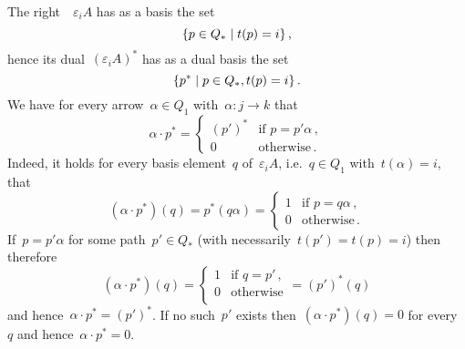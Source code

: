 \begin{remark*}
\begin{enumerate}
      The right~{}~$\varepsilon_i A$ has as a basis the set
      \begin{equation}
        \label{original basis}
        \{
          p \in Q_*
        \suchthat
          t(p) = i
        \}  \,,
      \end{equation}
      hence its dual~$(\varepsilon_i A)^*$ has as a dual basis the set
      \begin{equation}
        \label{dual basis}
        \{
          p^*
        \suchthat
          p \in Q_*,
          t(p) = i
        \}  \,.
      \end{equation}
      We have for every arrow~$\alpha \in Q_1$ with~$\alpha \colon j \to k$ that
      \begin{equation}
        \label{dual multiplication rule}
        \alpha \cdot p^*
        =
        \begin{cases}
          (p')^*  & \text{if~$p = p' \alpha$}  \,, \\
          0       & \text{otherwise}  \,.
        \end{cases}
      \end{equation}
      Indeed, it holds for every basis element~$q$ of~$\varepsilon_i A$, i.e.~$q \in Q_1$ with~$t(\alpha) = i$, that
      \[
        (\alpha \cdot p^*)(q)
        =
        p^*(q \alpha)
        =
        \begin{cases}
          1 & \text{if~$p = q \alpha$}  \,, \\
          0 & \text{otherwise}  \,.
        \end{cases}
      \]
      If~$p = p' \alpha$ for some path~$p' \in Q_*$ (with necessarily~$t(p') = t(p) = i$) then therefore
      \[
        (\alpha \cdot p^*)(q)
        =
        \begin{cases}
          1 & \text{if~$q = p'$}  \,, \\
          0 & \text{otherwise}        \\
        \end{cases}
        =
        (p')^*(q)
      \]
      and hence~$\alpha \cdot p^* = (p')^*$.
      If no such~$p'$ exists then~$(\alpha \cdot p^*)(q) = 0$ for every~$q$ and hence~$\alpha \cdot p^* = 0$.
      

\end{enumerate}
\end{remark*}
